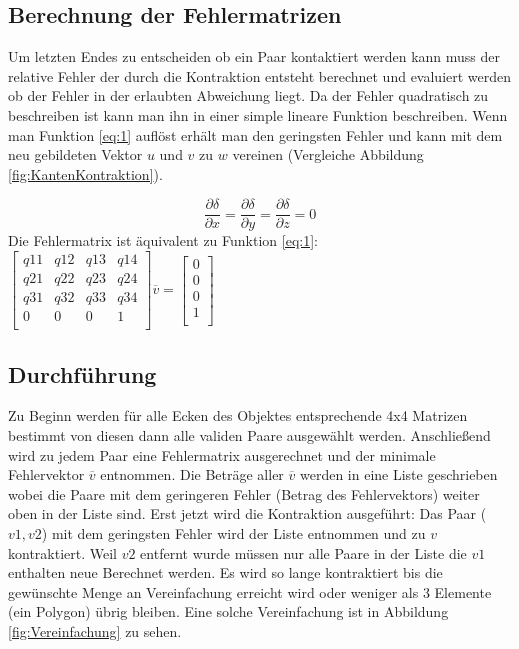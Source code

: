 \documentclass[runningheads]{llncs}
\begin{document}
\subsection{Berechnung der Fehlermatrizen}
    Um letzten Endes zu entscheiden ob ein Paar kontaktiert werden kann muss der relative Fehler der durch die Kontraktion entsteht berechnet und evaluiert werden ob der Fehler in der erlaubten Abweichung liegt.\newline
    Da der Fehler quadratisch zu beschreiben ist kann man ihn in einer simple lineare Funktion beschreiben. Wenn man Funktion \ref{eq:1} auflöst erhält man den geringsten Fehler und kann mit dem neu gebildeten Vektor $u$ und $v$ zu $w$ vereinen (Vergleiche Abbildung \ref{fig:KantenKontraktion}).
    
    \begin{equation} \label{eq:1}
    \frac{\partial \delta}{\partial x} = \frac{\partial \delta}{\partial y} = \frac{\partial \delta}{\partial z} = 0 
    \end{equation}
    Die Fehlermatrix ist äquivalent zu Funktion \ref{eq:1}:
    $\left[ \begin{array}{rrrr}
    q11 & q12 & q13 & q14 \\
    q21 & q22 & q23 & q24 \\
    q31 & q32 & q33 & q34 \\
    0 & 0 & 0 & 1 \\
    \end{array}\right] \overline{v} = 
    \left[ \begin{array}{r}
    0\\
    0\\
    0\\
    1 \\
    \end{array}\right] $\newline
    \subsection{Durchführung}
    Zu Beginn werden für alle Ecken des Objektes entsprechende 4x4 Matrizen bestimmt von diesen dann alle validen Paare ausgewählt werden. Anschließend wird zu jedem Paar eine Fehlermatrix ausgerechnet und der minimale Fehlervektor $\overline{v}$ entnommen. Die Beträge aller $\overline{v}$ werden in eine Liste geschrieben wobei die Paare mit dem geringeren Fehler (Betrag des Fehlervektors) weiter oben in der Liste sind.\newline
    Erst jetzt wird die Kontraktion ausgeführt: Das Paar ($v1, v2$) mit dem geringsten Fehler wird der Liste entnommen und zu $v$ kontraktiert. Weil $v2$ entfernt wurde müssen nur alle Paare in der Liste die $v1$ enthalten neue Berechnet werden.\newline
    Es wird so lange kontraktiert bis die gewünschte Menge an Vereinfachung erreicht wird oder weniger als 3 Elemente (ein Polygon) übrig bleiben. \newline
    Eine solche Vereinfachung ist in Abbildung \ref{fig:Vereinfachung} zu sehen.
    
\end{document}
